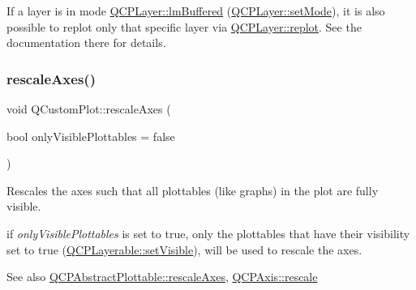 If a layer is in mode \hyperlink{class_q_c_p_layer_a67dcfc1590be2a1f2227c5a39bb59c7cada274b1644a2a3c1b794c052f1601bb2}{Q\+C\+P\+Layer\+::lm\+Buffered} (\hyperlink{class_q_c_p_layer_a938d57b04f4e4c23cedf1711f983919b}{Q\+C\+P\+Layer\+::set\+Mode}), it is also possible to replot only that specific layer via \hyperlink{class_q_c_p_layer_adefd53b6db02f470151c416f42e37180}{Q\+C\+P\+Layer\+::replot}. See the documentation there for details. \mbox{\label{class_q_custom_plot_ad86528f2cee6c7e446dea4a6e8839935}} 
\subsubsection{\texorpdfstring{rescale\+Axes()}{rescaleAxes()}}
{\footnotesize\ttfamily void Q\+Custom\+Plot\+::rescale\+Axes (\begin{DoxyParamCaption}\item[{bool}]{only\+Visible\+Plottables = {\ttfamily false} }\end{DoxyParamCaption})}

Rescales the axes such that all plottables (like graphs) in the plot are fully visible.

if {\itshape only\+Visible\+Plottables} is set to true, only the plottables that have their visibility set to true (\hyperlink{class_q_c_p_layerable_a3bed99ddc396b48ce3ebfdc0418744f8}{Q\+C\+P\+Layerable\+::set\+Visible}), will be used to rescale the axes.

\begin{DoxySeeAlso}{See also}
\hyperlink{class_q_c_p_abstract_plottable_a1491c4a606bccd2d09e65e11b79eb882}{Q\+C\+P\+Abstract\+Plottable\+::rescale\+Axes}, \hyperlink{class_q_c_p_axis_a499345f02ebce4b23d8ccec96e58daa9}{Q\+C\+P\+Axis\+::rescale} 
\end{DoxySeeAlso}
\mbox{\label{class_q_custom_plot_ae3a86ed0795670e50afa21759d4fa13d}} 
